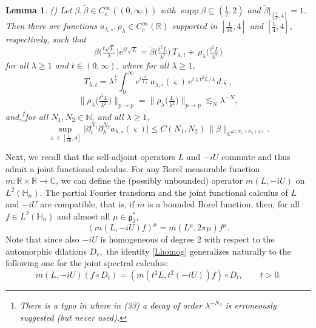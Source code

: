\documentclass[leqno]{amsart}
\newtheorem{lemma}[theorem]{Lemma}
\theoremstyle{definition}
\theoremstyle{remark}
\numberwithin{equation}{section}
\newcommand{\R}{\mathbb{R}}
\newcommand{\N}{\mathbb{N}}
\newcommand{\C}{\mathbb{C}}
\DeclareMathOperator*{\supp}{supp}
\newcommand\la{{\lambda}}
\newcommand\Coi{{C^\infty_{\mathrm c}}}
\newcommand{\g}{\mathfrak{g}}
\begin{document}
\begin{lemma}\label{lem:approx}(\cite[Proposition~4.1]{MuellerSeeger2015})
Let $\beta,\tilde \beta\in \Coi ((0,\infty))$ with $\supp \beta\subseteq (\frac 12,2)$ and ${\tilde \beta|_{[\frac 1 4 , 4 ]} = 1}$. Then there are functions $a_{\la,\circ},\rho_\lambda\in \Coi (\R)$ supported in $[\frac{1}{16}, 4 ]$ and $[\frac 1 4 , 4 ]$, respectively, such that
\begin{equation} \label{eq:subordination}
\beta\big(\tfrac{t\sqrt L}{\lambda}\big)e^{it\sqrt L} = \tilde\beta\big(\tfrac{t^2 L}{\lambda^2}\big) \, T_{\la,t} 
 + \, \rho_\lambda\big(\tfrac{t^2 L}{\lambda^2}\big)
\end{equation}
for all $\lambda\ge 1$ and $t\in (0,\infty)$, where for all $\lambda\ge 1$,
\begin{equation}\label{eq:Tlat} T_{\la,t}= \lambda^{\frac 12}\!\int_0^\infty e^{i\frac{\la }{ 4 \varsigma}} \, a_{\lambda,\circ}(\varsigma) \, 
e^{i \varsigma t^2 L/\la} \, 
d\varsigma ,
\end{equation}
\begin{equation}\label{eq:rhola-est} 
\| \rho_\lambda\big(\tfrac{t^2 L}{\lambda^2}\big) \|_{p\to p} = \| \rho_\lambda\big(\tfrac{L}{\lambda^2}\big) \|_{p\to p}\lesssim_N \lambda^{-N},
\end{equation}
and,\footnote{There is a typo in \cite[Prop 4.1]{MuellerSeeger2015}  where in (33) a decay of  order  $\la^{-N_2}$ is erroneously suggested  (but never used).}for all $N_1, N_2\in \N$, and all $\lambda\ge 1$, 
\begin{equation}\label{eq:ala}
 \sup_{\varsigma\in [\frac{1}{16}, 4 ]}\big|\partial_{\varsigma}^{N_1} \partial_\la^{N_2} a_{\lambda,\circ} (\varsigma) \big|\le C(N_1,N_2) \, \|\beta\|_{C^{2(N_1+N_2+1)}}. 
\end{equation}
\end{lemma}

Next, we recall that the self-adjoint operators  $L$ and $-iU$  commute and thus admit a joint functional calculus. For any Borel measurable function $m:\R\times \R\to\C$, we can define the (possibly unbounded) operator $m(L,-iU)$ on $L^2(\mathbb H_n)$. The partial Fourier transform and the joint functional calculus of $L$ and $-iU$ are compatible, that is, if $m$ is a bounded Borel function, then, for all $f\in L^2(\mathbb H_n)$ and almost all $\mu\in\g_2^*$,
\[
\left(m(L,-iU)f\right)^\mu = m(L^\mu,2\pi\mu) f^\mu.
\]
Note that since also $-iU$ is homogeneous of degree 2 with respect to the automorphic dilations $D_r,$ the identity \eqref{Lhomog}
generalizes naturally to the following one for the joint spectral calculus:
\begin{equation}\label{LUhomog}
m( L,-iU)(f\circ D_t)=(m(t^2L, t^2(-iU)) f)\circ D_t, \qquad t>0.
\end{equation}
\end{document}
